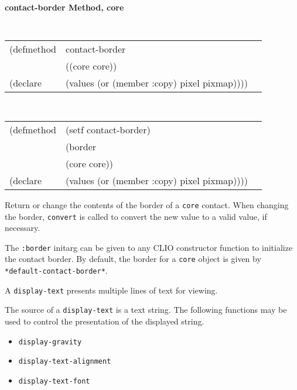 {\samepage
{\large {\bf contact-border \hfill Method, core}}
\begin{flushright} \parbox[t]{6.125in}{
\tt
\begin{tabular}{lll}
\raggedright
(defmethod & contact-border & \\
& ((core  core)) \\
(declare & (values (or (member :copy) pixel pixmap))))
\end{tabular}
\rm

}\end{flushright}}

{\samepage
\begin{flushright} \parbox[t]{6.125in}{
\tt
\begin{tabular}{lll}
\raggedright
(defmethod & (setf contact-border) & \\
         & (border \\
         & (core core)) \\
(declare & (values (or (member :copy) pixel pixmap))))
\end{tabular}
\rm
}
\end{flushright}}



\begin{flushright} \parbox[t]{6.125in}
{Return or change the contents of the border of a {\tt core} contact.
When changing the border, {\tt convert} is called to
convert the new value to a valid value, if necessary.

The {\tt :border} initarg can be given to any CLIO constructor function to
initialize the contact border.
By default, the border for a {\tt core} object is given by {\tt
{}
*default-contact-border*}. 


}\end{flushright}







A {\tt display-text} presents multiple lines of text for viewing.


The source of a {\tt display-text} is a text string. The following functions may be
used to control the presentation of the displayed string.

\begin{itemize}    
\item {\tt display-gravity} 
\item {\tt display-text-alignment} 
\item {\tt display-text-font} 
\end{itemize}

